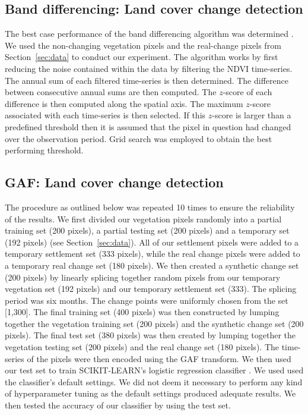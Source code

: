 \documentclass{article}
\begin{document}
\subsection{Band differencing: Land cover change detection}
\label{sec:diff}
The best case performance of the band differencing algorithm was determined \cite{lunetta2006}. We used the non-changing vegetation pixels and the real-change pixels from Section~\ref{sec:data} to conduct our experiment. The algorithm works by first reducing the noise contained within the data by filtering the NDVI time-series. The annual sum of each filtered time-series is then determined. The difference between consecutive annual sums are then computed. The $z$-score of each difference is then computed along the spatial axis. The maximum $z$-score associated with each time-series is then selected. If this $z$-score is larger than a predefined threshold then it is assumed that the pixel in question had changed over the observation period. Grid search was employed to obtain the best performing threshold.


\subsection{GAF: Land cover change detection}
\label{sec:gaf_change}
The procedure as outlined below was repeated 10 times to ensure the reliability of the results. We first divided our vegetation pixels randomly into a partial training set (200 pixels), a partial testing set (200 pixels) and a temporary set (192 pixels) (see Section~\ref{sec:data}). All of our settlement pixels were added to a temporary settlement set (333 pixels), while the real change pixels were added to a temporary real change set (180 pixels). We then created a synthetic change set (200 pixels) by linearly splicing together random pixels from our temporary vegetation set (192 pixels) and our temporary settlement set (333). The splicing period was six months. The change points were uniformly chosen from the set [1,300]. The final training  set (400 pixels) was then constructed by lumping together the vegetation training set (200 pixels) and the synthetic change set (200 pixels). The final test set (380 pixels) was then created by lumping together the vegetation testing set (200 pixels) and the real change set (180 pixels). The time-series of the pixels were then encoded using the GAF transform. We then used our test set to train \textsc{SCIKIT-LEARN}'s logistic regression classifier \cite{scikit2011}. We used used the classifier's default settings. We did not deem it necessary to perform any kind of hyperparameter tuning as the default settings produced adequate results. We then tested the accuracy of our classifier by using the test set. 
\end{document}

